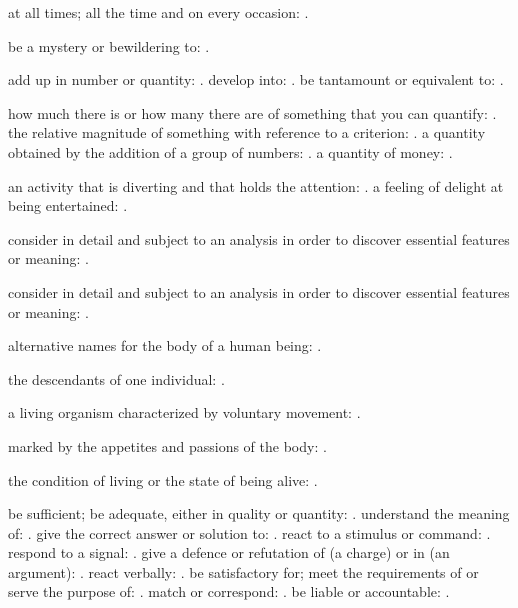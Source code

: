   at all times; all the time and on every occasion: .

  be a mystery or bewildering to: .

  add up in number or quantity: . develop into: . be tantamount or equivalent to: .

  how much there is or how many there are of something that you can quantify: . the relative magnitude of something with reference to a criterion: . a quantity obtained by the addition of a group of numbers: . a quantity of money: .

  an activity that is diverting and that holds the attention: . a feeling of delight at being entertained: .

  consider in detail and subject to an analysis in order to discover essential features or meaning: .

  consider in detail and subject to an analysis in order to discover essential features or meaning: .

  alternative names for the body of a human being: .

  the descendants of one individual: .

  a living organism characterized by voluntary movement: .

  marked by the appetites and passions of the body: .

  the condition of living or the state of being alive: .

  be sufficient; be adequate, either in quality or quantity: . understand the meaning of: . give the correct answer or solution to: . react to a stimulus or command: . respond to a signal: . give a defence or refutation of (a charge) or in (an argument): . react verbally: . be satisfactory for; meet the requirements of or serve the purpose of: . match or correspond: . be liable or accountable: .


